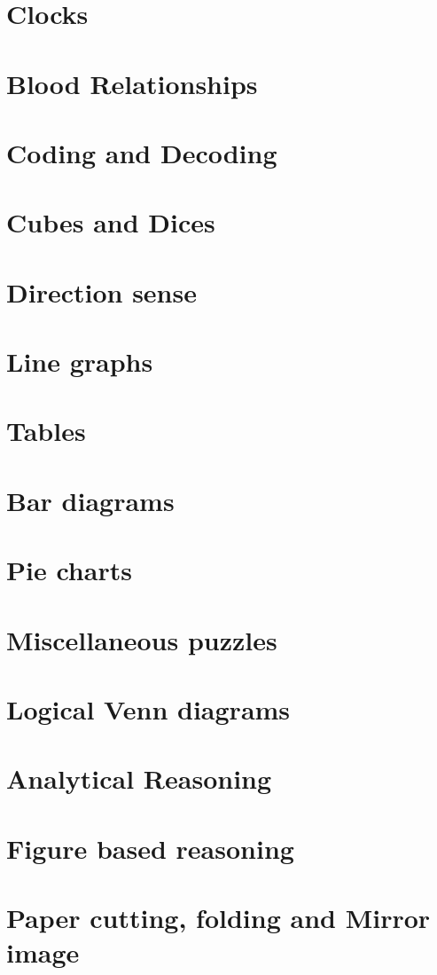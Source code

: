 \documentclass[8pt]{report}
\begin{document}
\chapter{Clocks}
\chapter{Blood Relationships}
\chapter{Coding and Decoding}
\chapter{Cubes and Dices}
\chapter{Direction sense}
\chapter{Line graphs}
\chapter{Tables}
\chapter{Bar diagrams}
\chapter{Pie charts}
\chapter{Miscellaneous puzzles}
\chapter{Logical Venn diagrams}
\chapter{Analytical Reasoning}
\chapter{Figure based reasoning}
\chapter{Paper cutting, folding and Mirror image}
\end{document}
